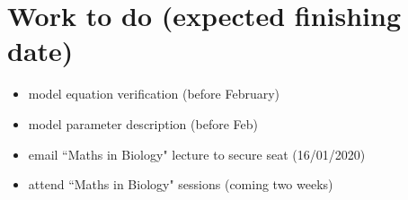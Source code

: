 \documentclass[a4paper,11pt]{article}
\begin{document}
    \section{Work to do (expected finishing date)}
    \begin{itemize}
        \item model equation verification (before February)
        \item model parameter description (before Feb)
        \item email ``Maths in Biology" lecture to secure seat (16/01/2020)
        \item attend ``Maths in Biology" sessions (coming two weeks)
    \end{itemize}
\end{document}

